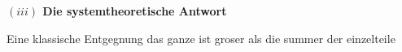 \documentclass[a4paper, emulatestandardclasses, 12pt]{scrartcl}
\begin{document}
\begin{onehalfspace}
\vspace{5mm}
\noindent\textbf{$(iii)$ Die systemtheoretische Antwort}

Eine klassische Entgegnung das ganze ist groser als die summer der einzelteile


\noindent


 
 

\noindent 




\end{onehalfspace}
\end{document}
